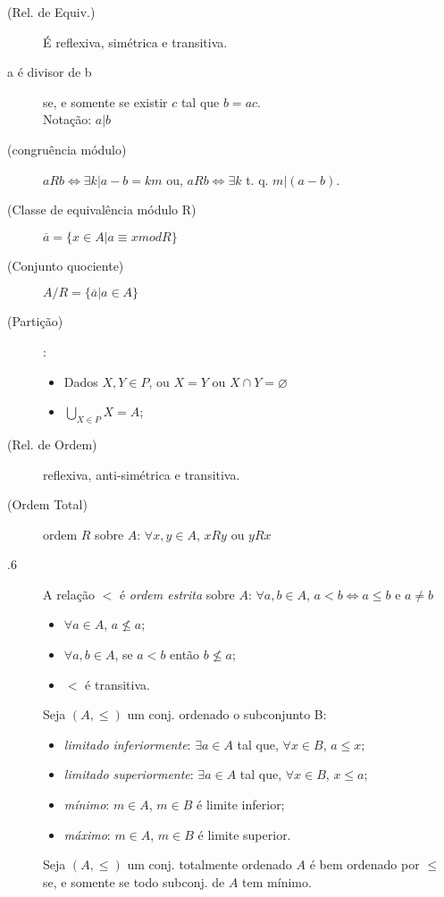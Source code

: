 \documentclass[11pt]{article}
\begin{document}
\begin{description}
  \item[ (Rel. de Equiv.)] É reflexiva, simétrica e transitiva.
  \item[ a é divisor de b] se, e somente se existir $c$ tal que $b = ac$.  \\
    Notação: $a|b$
  \item[ (congruência módulo)]
    $aRb \iff \exists k | a-b=km$ ou,
    $aRb \iff \exists k$ t. q. $m|(a-b)$.

  \item[ (Classe de equivalência módulo R)] $\overline{a} = \{ x \in A | a
    \equiv x mod R\}$
  \item[ (Conjunto quociente)] $A/R = \{ \overline{a} | a \in A \}$
  \item[ (Partição)]:
    \begin{itemize}
      \item Dados $X, Y \in P$, ou $X=Y$ ou $X\cap Y= \varnothing$
      \item $\bigcup\limits_{X \in P}X = A$;
    \end{itemize}
\end{description}


\begin{description}
  \item[ (Rel. de Ordem)] reflexiva, anti-simétrica e transitiva.
  \item[ (Ordem Total)] ordem $R$ sobre $A$:
    $\forall x,y \in A$, $xRy$ ou $yRx$
  \item[.6] A relação $<$ é \emph{ordem estrita} sobre $A$:
    $\forall a,b \in A$, $a < b \iff a \leq b$ e $a\neq b$

    \begin{itemize}
      \item $\forall a \in A$, $a \nleq a$;
      \item $\forall a,b \in A$, se $a<b$ então $b\nleq a$;
      \item $<$ é transitiva.
    \end{itemize}
  \item[] Seja $(A, \le)$ um conj. ordenado o subconjunto B:
    \begin{itemize}
      \item \emph{limitado inferiormente}: $\exists a \in A$ tal que, $\forall x
        \in B$, $a \leq x$;
      \item \emph{limitado superiormente}: $\exists a \in A$ tal que, $\forall x
        \in B$, $x \leq a$;
      \item \emph{mínimo}: $m \in A$, $m \in B$ é limite inferior;
      \item \emph{máximo}: $m \in A$, $m \in B$ é limite superior.
    \end{itemize}

  \item[] Seja $(A, \leq)$ um conj. totalmente ordenado $A$ é bem
    ordenado por $\leq$ se, e somente se todo subconj. de $A$ tem mínimo.
\end{description}
\end{document}
